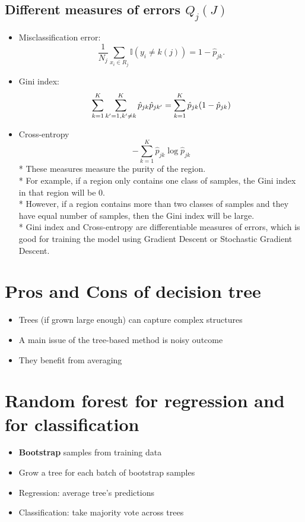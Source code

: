 \documentclass[twoside,12pt]{article}
\begin{document}
\subsection{Different measures of errors $Q_j(J)$}
\begin{itemize}
\item Misclassification error:
$$\frac{1}{N_j} \sum_{x_i \in R_j}\mathbb{I}(y_i \neq k(j))= 1 - \hat{p}_{jk}.$$
\item Gini index: 
$$\sum_{k=1}^K \sum_{k'=1,\\k'\neq k}^K \hat{p}_{jk}\hat{p}_{jk'} = \sum_{k=1}^K\hat{p}_{jk}(1-\hat{p}_{jk})$$
\item Cross-entropy
$$-\sum_{k=1}^K \hat{p}_{jk}\log \hat{p}_{jk}$$
* These measures measure the purity of the region. \\
* For example, if a region only contains one class of samples, the Gini index in that region will be 0. \\
* However, if a region contains more than two classes of samples and they have equal number of samples, then the Gini index will be large. \\
* Gini index and Cross-entropy are differentiable measures of errors, which is good for training the model using Gradient Descent or Stochastic Gradient Descent. 
\end{itemize}

\section{Pros and Cons of decision tree}
\begin{itemize}
\item Trees (if grown large enough) can capture complex structures
\item A main issue of the tree-based method is noisy outcome
\item They benefit from averaging
\end{itemize}

\section{\textbf{Random forest} for regression and for classification}
\begin{itemize}
\item \textbf{Bootstrap} samples from training data
\item Grow a tree for each batch of bootstrap samples
\item Regression: average tree's predictions
\item Classification: take majority vote across trees
\end{itemize}
\end{document}
